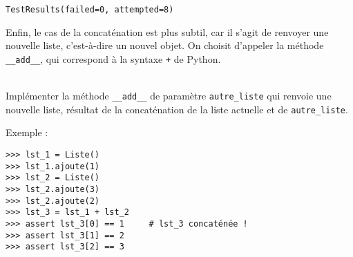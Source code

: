 \documentclass[a4paper,17pt]{extarticle}
\makeatletter
\newenvironment{eleve}%
{\begin{activite}\color{noiramu}\\[-0.5cm]}
{\end{activite}}
\newcommand{\boxspacing}{\kern\kvtcb@left@rule\kern\kvtcb@boxsep}
\newcommand{\prompt}[4]{
        \ttfamily\llap{{\color{#2}[#3]:\hspace{3pt}#4}}\vspace{-\baselineskip}
    }
\makeatother
\begin{document}
            \begin{tcolorbox}[breakable, size=fbox, boxrule=.5pt, pad at break*=1mm, opacityfill=0]
\prompt{Out}{outcolor}{12}{\boxspacing}
\begin{Verbatim}[commandchars=\\\{\}]
TestResults(failed=0, attempted=8)
\end{Verbatim}
\end{tcolorbox}
        
    Enfin, le cas de la concaténation est plus subtil, car il s'agit de
renvoyer une nouvelle liste, c'est-à-dire un nouvel objet. On choisit
d'appeler la méthode \texttt{\_\_add\_\_}, qui correspond à la syntaxe
\texttt{+} de Python.
\begin{eleve}
    Implémenter la méthode \texttt{\_\_add\_\_} de paramètre
\texttt{autre\_liste} qui renvoie une nouvelle liste, résultat de la
concaténation de la liste actuelle et de \texttt{autre\_liste}.

Exemple :

\begin{verbatim}
>>> lst_1 = Liste()
>>> lst_1.ajoute(1)
>>> lst_2 = Liste()
>>> lst_2.ajoute(3)
>>> lst_2.ajoute(2)
>>> lst_3 = lst_1 + lst_2
>>> assert lst_3[0] == 1     # lst_3 concaténée !
>>> assert lst_3[1] == 2
>>> assert lst_3[2] == 3
\end{verbatim}
        
        \end{eleve}
\end{document}
